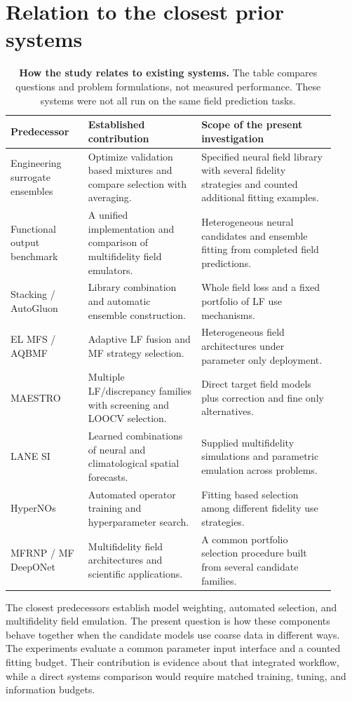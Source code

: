 \section{Relation to the closest prior systems}
\label{app:prior}
\begin{table}[h!]
\centering\small\setlength{\tabcolsep}{3pt}
\caption{\textbf{How the study relates to existing systems.}
The table compares questions and problem formulations, not measured performance.
These systems were not all run on the same field prediction tasks.}
\begin{tabular}{p{0.22\linewidth}p{0.32\linewidth}p{0.38\linewidth}}
\toprule
Predecessor & Established contribution & Scope of the present investigation \\
\midrule
Engineering surrogate ensembles \citep{acar2009,viana2009} & Optimize validation based mixtures and compare selection with averaging. & Specified neural field library with several fidelity strategies and counted additional fitting examples. \\
Functional output benchmark \citep{brunel2025} & A unified implementation and comparison of multifidelity field emulators. & Heterogeneous neural candidates and ensemble fitting from completed field predictions. \\
Stacking / AutoGluon \citep{wolpert1992,erickson2020} & Library combination and automatic ensemble construction. & Whole field loss and a fixed portfolio of LF use mechanisms. \\
EL MFS / AQBMF \citep{wang2024elmfs,lee2026aqbmf} & Adaptive LF fusion and MF strategy selection. & Heterogeneous field architectures under parameter only deployment. \\
MAESTRO \citep{kim2026maestro} & Multiple LF/discrepancy families with screening and LOOCV selection. & Direct target field models plus correction and fine only alternatives. \\
LANE SI \citep{borisova2024} & Learned combinations of neural and climatological spatial forecasts. & Supplied multifidelity simulations and parametric emulation across problems. \\
HyperNOs \citep{ghiotto2025} & Automated operator training and hyperparameter search. & Fitting based selection among different fidelity use strategies. \\
MFRNP / MF DeepONet \citep{niu2024,howard2023} & Multifidelity field architectures and scientific applications. & A common portfolio selection procedure built from several candidate families. \\
\bottomrule
\end{tabular}
\end{table}
The closest predecessors establish model weighting, automated selection, and
multifidelity field emulation. The present question is how these components
behave together when the candidate models use coarse data in different ways.
The experiments evaluate a common parameter input interface and a counted
fitting budget. Their contribution is evidence about that integrated
workflow, while a direct systems comparison would require matched training,
tuning, and information budgets.


